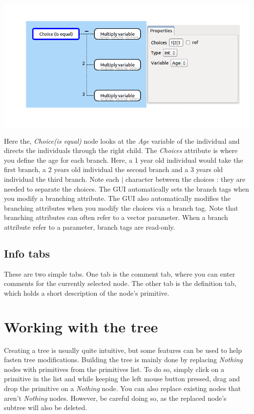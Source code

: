 \documentclass[a4paper,11pt]{report}
\begin{document}
\begin{center}
\includegraphics[scale=0.4]{Pictures/TreeEditor/nodeChoice.png}
\label{fig:attrBranch}
\end{center}

Here the, \emph{Choice(is equal)} node looks at the \emph{Age} variable of the individual and directs the individuals through the right child. The \emph{Choices} attribute is where you define the age for each branch. Here, a 1 year old individual would take the first branch, a 2 years old individual the second branch and a 3 years old individual the third branch. Note each \begin{math}|\end{math} character between the choices : they are needed to separate the choices. The GUI automatically sets the branch tags when you modify a branching attribute. The GUI also automatically modifies the branching attributes when you modify the choices via a branch tag. Note that branching attributes can often refer to a vector parameter. When a branch attribute refer to a parameter, branch tags are read-only.

\subsection{Info tabs}
\label{sec:infoTab}
These are two simple tabs. One tab is the comment tab, where you can enter comments for the currently selected node. The other tab is the definition tab, which holds a short description of the node's primitive.

\section{Working with the tree}
\label{sec:treeWork}
Creating a tree is usually quite intuitive, but some features can be used to help fasten tree modifications. Building the tree is mainly done by replacing \emph{Nothing} nodes with primitives from the primitives list. To do so, simply click on a primitive in the list and while keeping the left mouse button pressed, drag and drop the primitive on a \emph{Nothing} node. You can also replace existing nodes that aren't \emph{Nothing} nodes. However, be careful doing so, as the replaced node's subtree will also be deleted.
\end{document}

